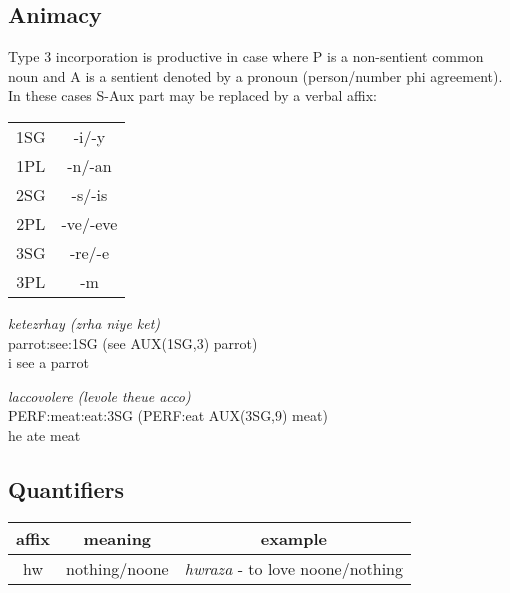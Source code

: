 \documentclass[9pt]{amsart}
\begin{document}
\subsection{Animacy}
Type 3 incorporation is productive in case where P is a non-sentient common noun and A is a sentient denoted by a pronoun (person/number phi agreement). In these cases S-Aux part may be replaced by a verbal affix:

\begin{tabular}{c | c}
  1SG & -i/-y \\
  1PL & -n/-an \\
  2SG & -s/-is \\
  2PL & -ve/-eve \\
  3SG & -re/-e \\
  3PL & -m \\
\end{tabular}

\begin{exe}
\ex 
\gll \textit{ketezrhay (zrha niye ket)} \\
  parrot:see:1SG (see AUX(1SG,3) parrot) \\
\trans i see a parrot

\ex 
\gll \textit{laccovolere (levole theue acco)} \\
  PERF:meat:eat:3SG (PERF:eat AUX(3SG,9) meat) \\
\trans he ate meat
\end{exe}

\subsection{Quantifiers}

\begin{center}
\begin{tabular}{c | c | c}
affix & meaning & example \\ \hline
hw & nothing/noone & \textit{hwraza} - to love noone/nothing \\
\end{tabular}
\end{center}
\end{document}
